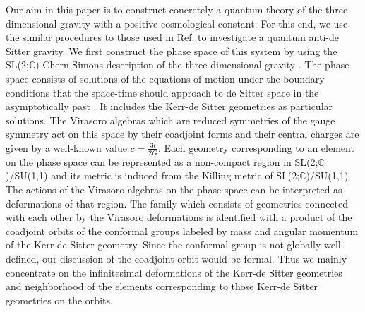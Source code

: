 \documentclass[a4paper,11pt]{article}
\begin{document}
Our aim in this paper is to construct concretely a quantum theory of 
the three-dimensional gravity with a positive cosmological constant.
For this end, 
we use the similar procedures to those used in Ref.\cite{NUY}
to investigate a quantum anti-de Sitter gravity.
We first construct the phase space of this system by using  
the SL(2;$\mathbb{C}$) Chern-Simons description of the three-dimensional
gravity \cite{Witten4}.
The phase space consists of solutions of the equations of motion
under the boundary conditions that the space-time should 
approach to de Sitter space in the asymptotically past \cite{Strominger}. 
It includes the Kerr-de Sitter geometries \cite{Deser-Jackiw, Park}
as particular solutions. 
The Virasoro algebras which are reduced symmetries of the gauge symmetry 
act on this space by their coadjoint forms 
and their central charges are given by a well-known value 
$c=\frac{3l}{2G}$.
Each geometry corresponding to an element on the phase space 
can be represented as a non-compact region in SL(2;$\mathbb{C}$)/SU(1,1) 
and its metric is induced from the Killing metric of 
SL(2;$\mathbb{C}$)/SU(1,1).
The actions of the Virasoro algebras on the phase space can be 
interpreted as deformations of that region.
The family which consists of geometries connected with each other 
by the Virasoro deformations is identified with a product of 
the coadjoint orbits of the conformal groups labeled by mass and 
angular momentum of the Kerr-de Sitter geometry.
Since the conformal group is not globally well-defined, 
our discussion of the coadjoint orbit would be formal.
Thus we mainly concentrate on the infinitesimal deformations of 
the Kerr-de Sitter geometries and neighborhood of the elements 
corresponding to those Kerr-de Sitter geometries on the orbits.
\end{document}
